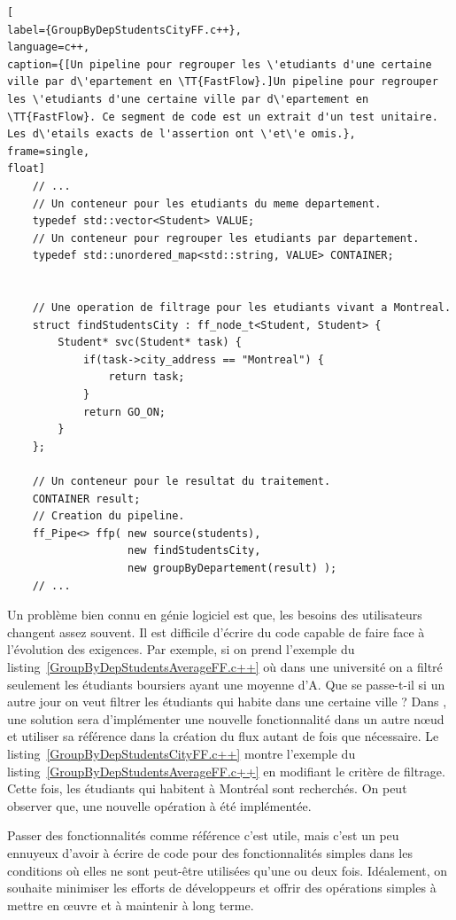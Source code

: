 \begin{lstlisting}[
label={GroupByDepStudentsCityFF.c++},
language=c++,
caption={[Un pipeline pour regrouper les \'etudiants d'une certaine ville par d\'epartement en \TT{FastFlow}.]Un pipeline pour regrouper les \'etudiants d'une certaine ville par d\'epartement en \TT{FastFlow}. Ce segment de code est un extrait d'un test unitaire. Les d\'etails exacts de l'assertion ont \'et\'e omis.},
frame=single,
float]
    // ...
    // Un conteneur pour les etudiants du meme departement.
    typedef std::vector<Student> VALUE;
    // Un conteneur pour regrouper les etudiants par departement.
    typedef std::unordered_map<std::string, VALUE> CONTAINER;

     
	// Une operation de filtrage pour les etudiants vivant a Montreal.
	struct findStudentsCity : ff_node_t<Student, Student> {
		Student* svc(Student* task) {
			if(task->city_address == "Montreal") {
				return task;
			}
			return GO_ON;
		}
	};

	// Un conteneur pour le resultat du traitement.
	CONTAINER result;
	// Creation du pipeline.
	ff_Pipe<> ffp( new source(students),
				   new findStudentsCity,
				   new groupByDepartement(result) );        
    // ...
\end{lstlisting}

Un probl\`eme bien connu en g\'enie logiciel est que, les besoins des utilisateurs changent assez souvent. Il est difficile d'\'ecrire du code capable de faire face \`a l'\'evolution des exigences. Par exemple, si on prend l'exemple du listing~\ref{GroupByDepStudentsAverageFF.c++} o\`u dans une universit\'e on a filtr\'e seulement les \'etudiants boursiers ayant une moyenne d'A. Que se passe-t-il si un autre jour on veut filtrer les \'etudiants qui habite dans une certaine ville ? Dans , une solution sera d'impl\'ementer une nouvelle fonctionnalit\'e dans un autre nœud et utiliser sa r\'ef\'erence dans la cr\'eation du flux autant de fois que n\'ecessaire. Le listing~\ref{GroupByDepStudentsCityFF.c++} montre l'exemple du listing~\ref{GroupByDepStudentsAverageFF.c++} en modifiant le crit\`ere de filtrage. Cette fois, les \'etudiants qui habitent \`a Montr\'eal sont recherchés. On peut observer que, une nouvelle op\'eration \`a \'et\'e impl\'ement\'ee.

Passer des fonctionnalit\'es comme r\'ef\'erence c'est utile, mais c'est un peu ennuyeux d'avoir \`a \'ecrire de code pour des fonctionnalit\'es simples dans les conditions o\`u elles ne sont peut-\^etre utilis\'ees qu'une ou deux fois. Id\'ealement, on souhaite minimiser les efforts de d\'eveloppeurs et offrir des op\'erations simples \`a mettre en œuvre et \`a maintenir \`a long terme. 


